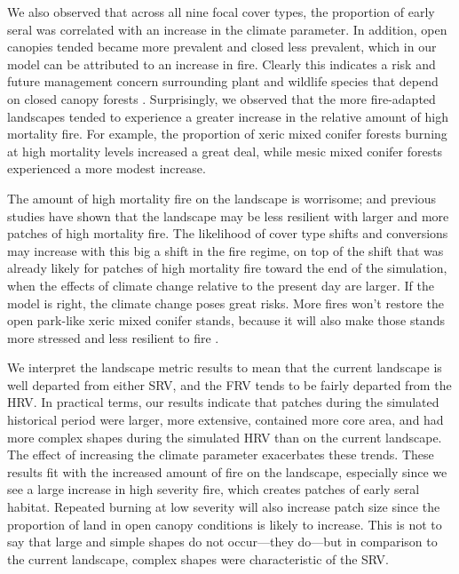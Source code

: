 \documentclass[12pt]{article}
\begin{document}
\begin{spacing}{1}
We also observed that across all nine focal cover types, the proportion of early seral was correlated with an increase in the climate parameter. In addition, open canopies tended became more prevalent and closed less prevalent, which in our model can be attributed to an increase in fire. Clearly this indicates a risk and future management concern surrounding plant and wildlife species that depend on closed canopy forests \citep{McKenzie2004}. Surprisingly, we observed that the more fire-adapted landscapes tended to experience a greater increase in the relative amount of high mortality fire. For example, the proportion of xeric mixed conifer forests burning at high mortality levels increased a great deal, while mesic mixed conifer forests experienced a more modest increase.

The amount of high mortality fire on the landscape is worrisome; and previous studies have shown that the landscape may be less resilient with larger and more patches of high mortality fire. The likelihood of cover type shifts and conversions may increase with this big a shift in the fire regime, on top of the shift that was already likely for patches of high mortality fire toward the end of the simulation, when the effects of climate change relative to the present day are larger. If the model is right, the climate change poses great risks. More fires won't restore the open park-like xeric mixed conifer stands, because it will also make those stands more stressed and less resilient to fire \citep{Lydersen2014}.



We interpret the landscape metric results to mean that the current landscape is well departed from either SRV, and the FRV tends to be fairly departed from the HRV. In practical terms, our results indicate that patches during the simulated historical period were larger, more extensive, contained more core area, and had more complex shapes during the simulated HRV than on the current landscape. The effect of increasing the climate parameter exacerbates these trends. These results fit with the increased amount of fire on the landscape, especially since we see a large increase in high severity fire, which creates patches of early seral habitat. Repeated burning at low severity will also increase patch size since the proportion of land in open canopy conditions is likely to increase. This is not to say that large and simple shapes do not occur—they do—but in comparison to the current landscape, complex shapes were characteristic of the SRV.


\end{spacing}
\end{document}
